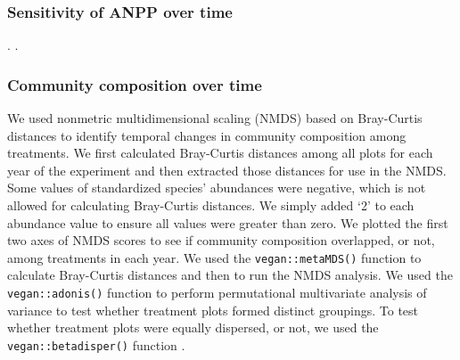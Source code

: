 \documentclass[fleqn,10pt,lineno]{wlpeerj} %
\begin{document}
\subsubsection{Sensitivity of ANPP over
time}\label{sensitivity-of-anpp-over-time}


\citet{Wilcox2017}.
\citep{R2016}.

\subsubsection{Community composition over
time}\label{community-composition-over-time}

We used nonmetric multidimensional scaling (NMDS) based on Bray-Curtis
distances to identify temporal changes in community composition among
treatments. We first calculated Bray-Curtis distances among all plots
for each year of the experiment and then extracted those distances for
use in the NMDS. Some values of standardized species' abundances were
negative, which is not allowed for calculating Bray-Curtis distances. We
simply added `2' to each abundance value to ensure all values were
greater than zero. We plotted the first two axes of NMDS scores to see
if community composition overlapped, or not, among treatments in each
year. We used the \texttt{vegan::metaMDS()} function \citep{Oksanen2016}
to calculate Bray-Curtis distances and then to run the NMDS analysis. We
used the \texttt{vegan::adonis()} function \citep{Oksanen2016} to
perform permutational multivariate analysis of variance to test whether
treatment plots formed distinct groupings. To test whether treatment
plots were equally dispersed, or not, we used the
\texttt{vegan::betadisper()} function \citep{Oksanen2016}.
\end{document}
